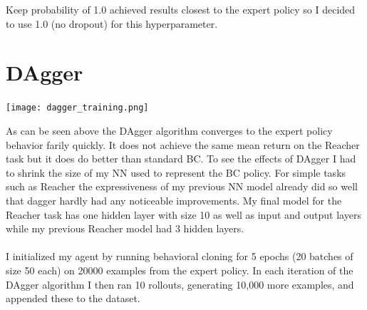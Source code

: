 \documentclass[12pt]{report}
\begin{document}
Keep probability of 1.0 achieved results closest to the expert policy so I decided to use 1.0 (no dropout) for this hyperparameter.
\newpage
\section*{DAgger}
\begin{center}
\texttt{[image: dagger\_training.png]}
\end{center}

As can be seen above the DAgger algorithm converges to the expert policy behavior farily quickly. It does not achieve the same mean return on the Reacher task but it does do better than standard BC. To see the effects of DAgger I had to shrink the size of my NN used to represent the BC policy. For simple tasks such as Reacher the expressiveness of my previous NN model already did so well that dagger hardly had any noticeable improvements. My final model for the Reacher task has one hidden layer with size 10 as well as input and output layers while my previous Reacher model had 3 hidden layers.\\
\\
I initialized my agent by running behavioral cloning for 5 epochs (20 batches of size 50 each) on 20000 examples from the expert policy. In each iteration of the DAgger algorithm I then ran 10 rollouts, generating 10,000 more examples, and appended these to the dataset.
\end{document}

